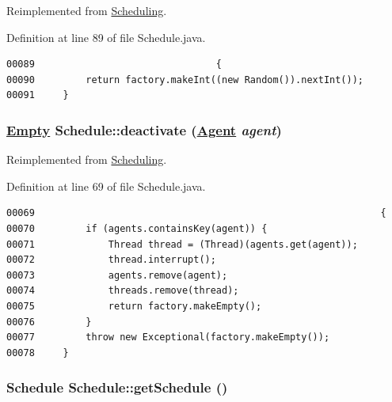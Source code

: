 Reimplemented from \hyperlink{interfaceScheduling_a6}{Scheduling}.

Definition at line 89 of file Schedule.java.\footnotesize\begin{verbatim}00089                                {
00090         return factory.makeInt((new Random()).nextInt());
00091     }
\end{verbatim}\normalsize 
\hypertarget{classSchedule_a3}{
\subsubsection[deactivate]{\setlength{\rightskip}{0pt plus 5cm}\hyperlink{interfaceEmpty}{Empty} Schedule::deactivate (\hyperlink{interfaceAgent}{Agent} {\em agent})}}
\label{classSchedule_a3}




Reimplemented from \hyperlink{interfaceScheduling_a3}{Scheduling}.

Definition at line 69 of file Schedule.java.\footnotesize\begin{verbatim}00069                                                             {
00070         if (agents.containsKey(agent)) {
00071             Thread thread = (Thread)(agents.get(agent));
00072             thread.interrupt();
00073             agents.remove(agent);
00074             threads.remove(thread);
00075             return factory.makeEmpty();
00076         }
00077         throw new Exceptional(factory.makeEmpty());
00078     }
\end{verbatim}\normalsize 
\hypertarget{classSchedule_d1}{
\subsubsection[getSchedule]{\setlength{\rightskip}{0pt plus 5cm}Schedule Schedule::get\-Schedule ()}}
\label{classSchedule_d1}




